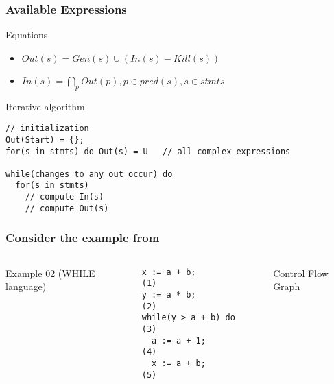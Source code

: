 \begin{frame}[fragile]
  \frametitle{Available Expressions} 

  \begin{block}{Equations}
    \begin{itemize}
    \item $Out(s) = Gen(s) \cup (In(s) - Kill(s))$  
    \item $In(s) = \bigcap_p Out(p), p \in pred(s), s \in stmts$
    \end{itemize}
  \end{block}

  \pause

\begin{block}{Iterative algorithm}
\begin{small}
\begin{verbatim}
// initialization
Out(Start) = {};
for(s in stmts) do Out(s) = U   // all complex expressions

while(changes to any out occur) do  
  for(s in stmts)
    // compute In(s) 
    // compute Out(s)   
\end{verbatim}
\end{small}
\end{block}
\end{frame}

\begin{frame}[fragile]
  \frametitle{Consider the example from~\cite{ppa-book}}

    \begin{columns}
Example 02 (WHILE language)
    
\begin{verbatim}
x := a + b;           (1)
y := a * b;           (2)
while(y > a + b) do   (3)
  a := a + 1;         (4) 
  x := a + b;         (5) 
\end{verbatim}

\pause Control Flow Graph

\end{columns}
  
\end{frame}



